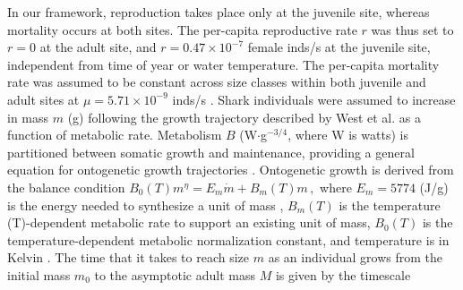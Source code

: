\documentclass[]{rsos}%
\begin{document}
In our framework, reproduction takes place only at the juvenile site, whereas mortality occurs at both sites.
The per-capita reproductive rate $r$ was thus set to $r=0$ at the adult site, and $r = 0.47 \times 10^{-7}$ female inds/s \cite{cortes1996comparative} at the juvenile site, independent from time of year or water temperature. 
The per-capita mortality rate was assumed to be constant across size classes within both juvenile and adult sites at $\mu = 5.71 \times 10^{-9}$ inds/s \cite{schindler2002sharks}. 
Shark individuals were assumed to increase in mass $m$ (g) following the growth trajectory described by West et al. \cite{West:2001bv} as a function of metabolic rate.
Metabolism $B$ (W$\cdot$g${}^{-3/4}$, where W is watts) is partitioned between somatic growth and maintenance, providing a general equation for ontogenetic growth trajectories \cite{West:2001bv}. 
Ontogenetic growth is derived from the balance condition 
$B_{0}(T)m^{\eta}=E_{m}\dot{m}+B_{m}(T)m\,,$
where $E_{m} = 5774$ (J/g) is the energy needed to synthesize a unit of mass \cite{moses2008rmo}, $B_{m}(T)$ is the temperature (T)-dependent metabolic rate to support an existing unit of mass, $B_0(T)$ is the temperature-dependent metabolic normalization constant, and temperature is in Kelvin \cite{West:2001bv}. 
The time that it takes to reach size $m$ as an individual grows from the initial mass $m_0$ to the asymptotic adult mass $M$ is given by the timescale
\end{document}

